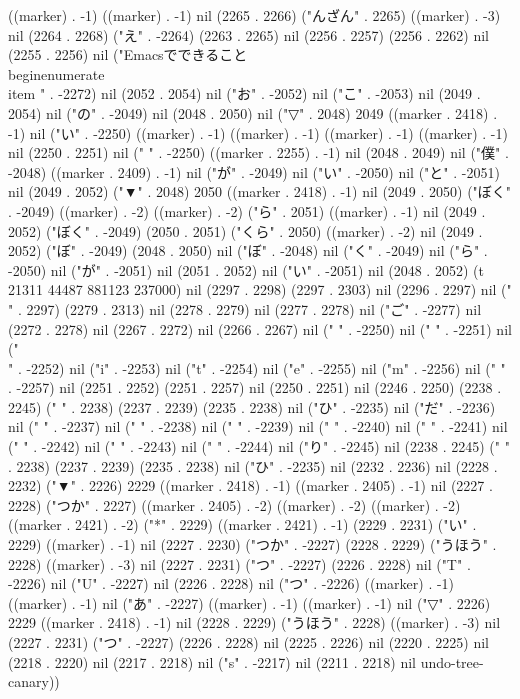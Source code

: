 ((marker) . -1) ((marker) . -1) nil (2265 . 2266) ("んざん" . 2265) ((marker) . -3) nil (2264 . 2268) ("え" . -2264) (2263 . 2265) nil (2256 . 2257) (2256 . 2262) nil (2255 . 2256) nil ("Emacsでできること
\\begin{enumerate}
 \\item 
" . -2272) nil (2052 . 2054) nil ("お" . -2052) nil ("こ" . -2053) nil (2049 . 2054) nil ("の" . -2049) nil (2048 . 2050) nil ("▽" . 2048) 2049 ((marker . 2418) . -1) nil ("い" . -2250) ((marker) . -1) ((marker) . -1) ((marker) . -1) ((marker) . -1) nil (2250 . 2251) nil (" " . -2250) ((marker . 2255) . -1) nil (2048 . 2049) nil ("僕" . -2048) ((marker . 2409) . -1) nil ("が" . -2049) nil ("い" . -2050) nil ("と" . -2051) nil (2049 . 2052) ("▼" . 2048) 2050 ((marker . 2418) . -1) nil (2049 . 2050) ("ぼく" . -2049) ((marker) . -2) ((marker) . -2) ("ら" . 2051) ((marker) . -1) nil (2049 . 2052) ("ぼく" . -2049) (2050 . 2051) ("くら" . 2050) ((marker) . -2) nil (2049 . 2052) ("ぼ" . -2049) (2048 . 2050) nil ("ぼ" . -2048) nil ("く" . -2049) nil ("ら" . -2050) nil ("が" . -2051) nil (2051 . 2052) nil ("い" . -2051) nil (2048 . 2052) (t 21311 44487 881123 237000) nil (2297 . 2298) (2297 . 2303) nil (2296 . 2297) nil (" " . 2297) (2279 . 2313) nil (2278 . 2279) nil (2277 . 2278) nil ("ご" . -2277) nil (2272 . 2278) nil (2267 . 2272) nil (2266 . 2267) nil ("
" . -2250) nil (" " . -2251) nil ("\\" . -2252) nil ("i" . -2253) nil ("t" . -2254) nil ("e" . -2255) nil ("m" . -2256) nil (" " . -2257) nil (2251 . 2252) (2251 . 2257) nil (2250 . 2251) nil (2246 . 2250) (2238 . 2245) (" " . 2238) (2237 . 2239) (2235 . 2238) nil ("ひ" . -2235) nil ("だ" . -2236) nil ("
" . -2237) nil (" " . -2238) nil (" " . -2239) nil (" " . -2240) nil (" " . -2241) nil (" " . -2242) nil (" " . -2243) nil (" " . -2244) nil ("り" . -2245) nil (2238 . 2245) (" " . 2238) (2237 . 2239) (2235 . 2238) nil ("ひ" . -2235) nil (2232 . 2236) nil (2228 . 2232) ("▼" . 2226) 2229 ((marker . 2418) . -1) ((marker . 2405) . -1) nil (2227 . 2228) ("つか" . 2227) ((marker . 2405) . -2) ((marker) . -2) ((marker) . -2) ((marker . 2421) . -2) ("*" . 2229) ((marker . 2421) . -1) (2229 . 2231) ("い" . 2229) ((marker) . -1) nil (2227 . 2230) ("つか" . -2227) (2228 . 2229) ("うほう" . 2228) ((marker) . -3) nil (2227 . 2231) ("つ" . -2227) (2226 . 2228) nil ("T" . -2226) nil ("U" . -2227) nil (2226 . 2228) nil ("つ" . -2226) ((marker) . -1) ((marker) . -1) nil ("あ" . -2227) ((marker) . -1) ((marker) . -1) nil ("▽" . 2226) 2229 ((marker . 2418) . -1) nil (2228 . 2229) ("うほう" . 2228) ((marker) . -3) nil (2227 . 2231) ("つ" . -2227) (2226 . 2228) nil (2225 . 2226) nil (2220 . 2225) nil (2218 . 2220) nil (2217 . 2218) nil ("s" . -2217) nil (2211 . 2218) nil undo-tree-canary))
